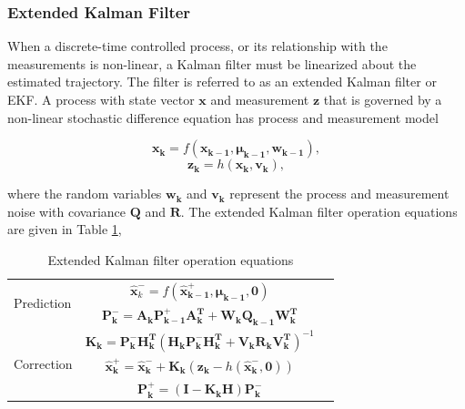 \subsubsection{Extended Kalman Filter}
When a discrete-time controlled process, or its relationship with the
measurements is non-linear, a Kalman filter must be linearized about
the estimated trajectory. The filter is referred to as an extended
Kalman filter or EKF. A process with state vector $\boldsymbol{x}$ and
measurement $\boldsymbol{z}$ that is governed by a non-linear
stochastic difference equation has process and measurement model

\begin{equation}
\boldsymbol{x_k}=f(\boldsymbol{x_{k-1}}, \boldsymbol{\mu_{k-1}}, \boldsymbol{w_{k-1}}),
\end{equation}
\begin{equation}
\boldsymbol{z_k}=h(\boldsymbol{x_k}, \boldsymbol{v_k}),
\end{equation}

\noindent where the random variables $\boldsymbol{w_k}$ and $\boldsymbol{v_k}$ represent the
process and measurement noise with covariance $\boldsymbol{Q}$ and $\boldsymbol{R}$. The extended
Kalman filter operation equations are given in Table \ref{tab:EKF},

\begin{table}[H]
\caption{Extended Kalman filter operation equations}
\label{tab:EKF}
\centering
\begin{tabular}{|l|c r|}
\hline
\multirow{2}{*}{Prediction} 
& $\boldsymbol{\hat{x}}^-_k=f(\boldsymbol{\hat{x}^+_{k-1}},\boldsymbol{\mu_{k-1}},\boldsymbol{0})$ 
& \stepcounter{equation}\thetag{\theequation}\\
& $\boldsymbol{P^-_k} = \boldsymbol{A_kP^+_{k-1}A_k^T}+\boldsymbol{W_kQ_{k-1}W_k^T}$ & \stepcounter{equation}\thetag{\theequation}\\
\hline
\multirow{3}{*}{Correction}
& $\boldsymbol{K_k}=\boldsymbol{P^-_kH_k^T}(\boldsymbol{H_kP^-_kH_k^T}+\boldsymbol{V_kR_kV_k^T})^{-1}$  
& \stepcounter{equation}\thetag{\theequation}\\
& $\boldsymbol{\hat{x}^+_k}=\boldsymbol{\hat{x}^-_k}+\boldsymbol{K_k}(\boldsymbol{z_k}-h(\boldsymbol{\hat{x}^-_k},\boldsymbol{0}))$ 
& \stepcounter{equation}\thetag{\theequation}\\
& $\boldsymbol{P^+_k}=(\boldsymbol{I}-\boldsymbol{K_kH})\boldsymbol{P^-_k}$ 
& \stepcounter{equation}\thetag{\theequation}\\
\hline
\end{tabular}
\end{table}
\FloatBarrier

